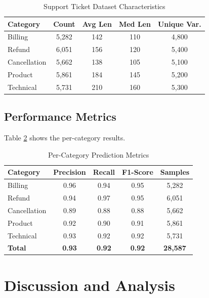 \documentclass[conference]{IEEEtran}
\begin{document}
\begin{table}[htbp]
\caption{Support Ticket Dataset Characteristics}
\begin{center}
\begin{tabular}{|l|c|c|c|c|}
\hline
\textbf{Category} & \textbf{Count} & \textbf{Avg Len} & \textbf{Med Len} & \textbf{Unique Var.} \\
\hline
Billing & 5,282 & 142 & 110 & 4,800 \\
Refund & 6,051 & 156 & 120 & 5,400 \\
Cancellation & 5,662 & 138 & 105 & 5,100 \\
Product & 5,861 & 184 & 145 & 5,200 \\
Technical & 5,731 & 210 & 160 & 5,300 \\
\hline
\end{tabular}
\label{tab:dataset_stats}
\end{center}
\end{table}

\subsection{Performance Metrics}
Table \ref{tab:cat_metrics} shows the per-category results.

\begin{table}[htbp]
\caption{Per-Category Prediction Metrics}
\begin{center}
\begin{tabular}{|l|c|c|c|c|}
\hline
\textbf{Category} & \textbf{Precision} & \textbf{Recall} & \textbf{F1-Score} & \textbf{Samples} \\
\hline
Billing & 0.96 & 0.94 & 0.95 & 5,282 \\
Refund & 0.94 & 0.97 & 0.95 & 6,051 \\
Cancellation & 0.89 & 0.88 & 0.88 & 5,662 \\
Product & 0.92 & 0.90 & 0.91 & 5,861 \\
Technical & 0.93 & 0.92 & 0.92 & 5,731 \\
\hline
\textbf{Total} & \textbf{0.93} & \textbf{0.92} & \textbf{0.92} & \textbf{28,587} \\
\hline
\end{tabular}
\label{tab:cat_metrics}
\end{center}
\end{table}

\section{Discussion and Analysis}
\end{document}
